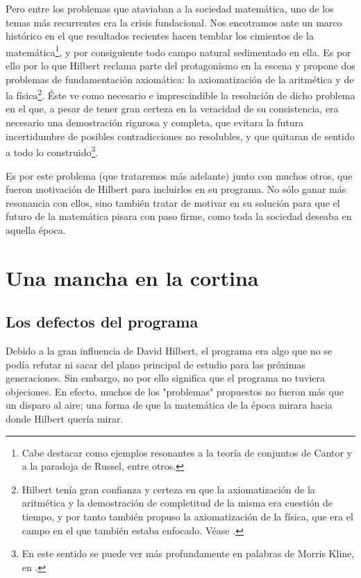 Pero entre los problemas que ataviaban a la sociedad matemática, uno de los temas más recurrentes era la crisis fundacional. Nos encotramos ante un marco histórico 
en el que resultados recientes hacen temblar los cimientos de la matemática\footnote{Cabe destacar como ejemplos resonantes a la teoría de conjuntos de Cantor y a la paradoja 
de Russel, entre otros.}, y por consiguiente todo campo natural sedimentado en ella. Es por ello por lo que Hilbert reclama parte del protagonismo en la escena y propone dos problemas
de fundamentación axiomática: la axiomatización de la aritmética y de la física\footnote{Hilbert tenía gran confianza y certeza en que la axiomatización de la aritmética y la demostración de 
completitud de la misma era cuestión de tiempo, y por tanto también propuso la axiomatización de la física, que era el campo en el que también estaba enfocado. Véase \cite{kreisel1976have}.}.
Éste ve como necesario e imprescindible la resolución de dicho problema en el que, a pesar de tener gran certeza en la veracidad de su consistencia, era necesario una demostración rigurosa
y completa, que evitara la futura incertidumbre de posibles contradicciones no resolubles, y que quitaran de sentido a todo lo construido\footnote{En este sentido se puede ver más profundamente 
en palabras de Morris Kline, en \cite{kline2000matematicas}.}.

Es por este problema (que trataremos más adelante) junto con muchos otros, que fueron motivación de Hilbert para incluirlos en su programa. No sólo ganar más resonancia con ellos, sino 
también tratar de motivar en su solución para que el futuro de la matemática pisara con paso firme, como toda la sociedad deseaba en aquella época.

\chapter{Una mancha en la cortina} \label{ch:Hilbert-2}

\section{Los defectos del programa}

Debido a la gran influencia de David Hilbert, el programa era algo que no se podía refutar ni sacar del plano principal de estudio para las próximas generaciones. Sin embargo,
no por ello significa que el programa no tuviera objeciones. En efecto, muchos de los "problemas" propuestos no fueron más que un disparo al aire; una forma de que la matemática 
de la época mirara hacia donde Hilbert quería mirar. 

